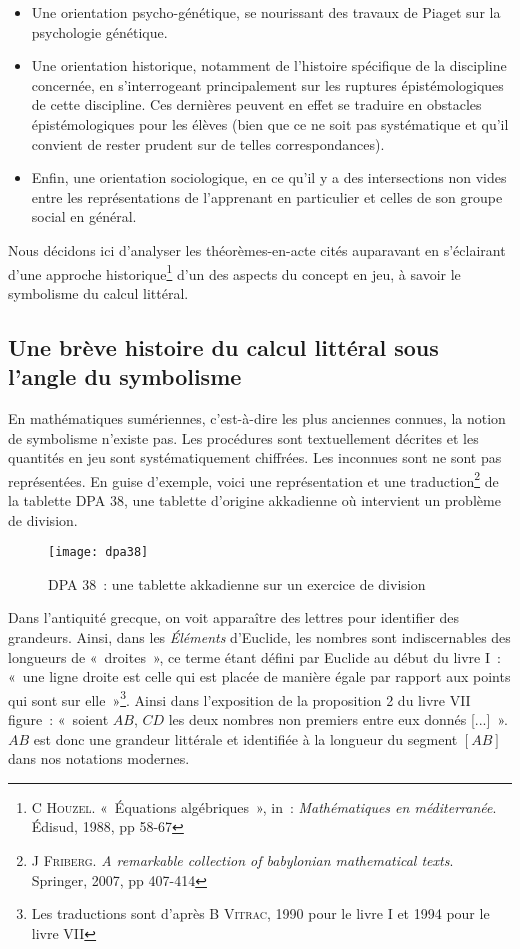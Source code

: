 \documentclass{report}
\theoremstyle{definition}
\newcommand{\tas}{théorèmes-en-acte }
\begin{document}
\begin{itemize}
    \item Une orientation psycho-génétique, se nourissant des travaux de Piaget sur la psychologie génétique.
    \item Une orientation historique, notamment de l'histoire spécifique de la discipline concernée, en s'interrogeant principalement sur les ruptures épistémologiques de cette discipline. Ces dernières peuvent en effet se traduire en obstacles épistémologiques pour les élèves (bien que ce ne soit pas systématique et qu'il convient de rester prudent sur de telles correspondances).
    \item Enfin, une orientation sociologique, en ce qu'il y a des intersections non vides entre les représentations de l'apprenant en particulier et celles de son groupe social en général.
\end{itemize}

Nous décidons ici d'analyser les \tas cités auparavant en s'éclairant d'une approche historique\footnote{\textsc{C Houzel}. «~Équations algébriques~», in~: \textit{Mathématiques en méditerranée}. Édisud, 1988, pp 58-67} d'un des aspects du concept en jeu, à savoir le symbolisme du calcul littéral.

\subsection*{Une brève histoire du calcul littéral sous l'angle du symbolisme}

En mathématiques sumériennes, c'est-à-dire les plus anciennes connues, la notion de symbolisme n'existe pas. Les procédures sont textuellement décrites et les quantités en jeu sont systématiquement chiffrées. Les inconnues sont ne sont pas représentées. En guise d'exemple, voici une représentation et une traduction\footnote{\textsc{J Friberg}. \textit{A remarkable collection of babylonian mathematical texts}. Springer, 2007, pp 407-414} de la tablette DPA 38, une tablette d'origine akkadienne où intervient un problème de division.

\begin{figure}[h]
\begin{center}
\texttt{[image: dpa38]}
\end{center}
\caption{DPA 38~: une tablette akkadienne sur un exercice de division}
\end{figure}


Dans l'antiquité grecque, on voit apparaître des lettres pour identifier des grandeurs. Ainsi, dans les \textit{Éléments} d'Euclide, les nombres sont indiscernables des longueurs de «~droites~», ce terme étant défini par Euclide au début du livre I~: «~une ligne droite est celle qui est placée de manière égale par rapport aux points qui sont sur elle~»\footnote{Les traductions sont d'après \textsc{B Vitrac}, 1990 pour le livre I et 1994 pour le livre VII}. Ainsi dans l'exposition de la proposition 2 du livre VII figure~: «~soient $AB$, $CD$ les deux nombres non premiers entre eux donnés [...]~». $AB$ est donc une grandeur littérale et identifiée à la longueur du segment $[AB]$ dans nos notations modernes.
\end{document}
